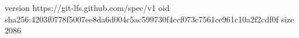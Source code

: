 version https://git-lfs.github.com/spec/v1
oid sha256:4203f0778f5007ee8da6d004c5ac599730f4ccf073c7561ce961c10a2f2cdf0f
size 2086
